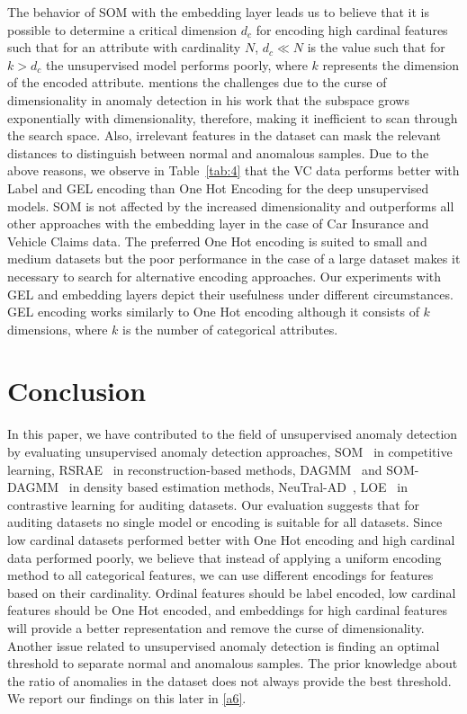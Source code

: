 \documentclass{article}
\begin{document}
The behavior of SOM with the embedding layer leads us to believe that it is possible to determine a critical dimension $d_c$ for encoding high cardinal features such that for an attribute with cardinality $N$, $d_c \ll N$ is the value such that for $k > d_c$ the unsupervised model performs poorly, where $k$ represents the dimension of the encoded attribute. \citep{zimek} mentions the challenges due to the curse of dimensionality in anomaly detection in his work that the subspace grows exponentially with dimensionality, therefore, making it inefficient to scan through the search space. Also, irrelevant features in the dataset can mask the relevant distances to distinguish between normal and anomalous samples. Due to the above reasons, we observe in Table~\ref{tab:4} that the VC data performs better with Label and GEL encoding than One Hot Encoding for the deep unsupervised models. SOM is not affected by the increased dimensionality and outperforms all other approaches with the embedding layer in the case of Car Insurance and Vehicle Claims data. The preferred One Hot encoding is suited to small and medium datasets but the poor performance in the case of a large dataset makes it necessary to search for alternative encoding approaches. Our experiments with GEL and embedding layers depict their usefulness under different circumstances. GEL encoding works similarly to One Hot encoding although it consists of $k$ dimensions, where $k$ is the number of categorical attributes.

\section{Conclusion}
In this paper, we have contributed to the field of unsupervised anomaly detection by evaluating unsupervised anomaly detection approaches, SOM~\citep{som} in competitive learning, RSRAE~\citep{rsrae} in reconstruction-based methods, DAGMM~\citep{dagmm} and SOM-DAGMM~\citep{som} in density based estimation methods, NeuTral-AD~\citep{qiu2021neural}, LOE~\citep{qiu2022latent} in contrastive learning for auditing datasets. Our evaluation suggests that for auditing datasets no single model or encoding is suitable for all  datasets. Since low cardinal datasets performed better with One Hot encoding and high cardinal data performed poorly, we believe that instead of applying a uniform encoding method to all categorical features, we can use different encodings for features based on their cardinality. Ordinal features should be label encoded, low cardinal features should be One Hot encoded, and embeddings for high cardinal features will provide a better representation and remove the curse of dimensionality.
Another issue related to unsupervised anomaly detection is finding an optimal threshold to separate normal and anomalous samples. The prior knowledge about the ratio of anomalies in the dataset does not always provide the best threshold. We report our findings on this later in \ref{a6}. 
\end{document}
